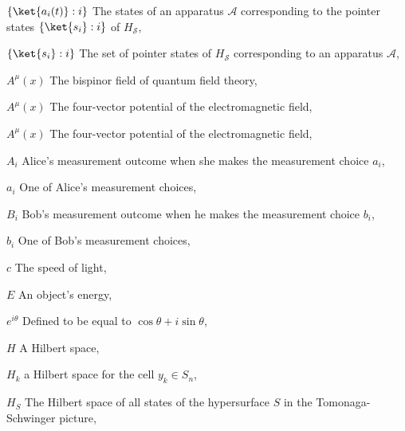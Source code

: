 \begin{thenomenclature}
      \item [{$\{\ket{a_i(t)}:i\}$}]\begingroup The states of an apparatus $\mathcal{A}$  corresponding to the pointer states $\{\ket{s_i}:i\}$ of $H_\mathcal{S}$, \nomrefpage{}
      \item [{$\{\ket{s_i}:i\}$}]\begingroup The set of pointer states of $H_\mathcal{S}$  corresponding to an apparatus $\mathcal{A}$, \nomrefpage{}
      \item [{$A^\mu (x)$}]\begingroup The bispinor field of quantum field theory, \nomrefpage {}
      \item [{$A^\mu (x)$}]\begingroup The four-vector potential of the electromagnetic field, \nomrefpage {}
      \item [{$A^\mu (x)$}]\begingroup The four-vector potential of the electromagnetic field, \nomrefpage {}
      \item [{$A_i$}]\begingroup Alice's measurement outcome when she makes the measurement choice $a_i$, \nomrefpage{}
      \item [{$a_i$}]\begingroup One of Alice's measurement choices, \nomrefpage{}
      \item [{$B_i$}]\begingroup Bob's measurement outcome when he makes the measurement choice $b_i$, \nomrefpage{}
      \item [{$b_i$}]\begingroup One of Bob's measurement choices, \nomrefpage{}
      \item [{$c$}]\begingroup The speed of light, \nomrefpage {}
      \item [{$E$}]\begingroup An object's energy, \nomrefpage{}
      \item [{$e^{i \theta }$}]\begingroup Defined to be equal to $\cos \theta + i\sin \theta $, \nomrefpage {}
      \item [{$H$}]\begingroup A Hilbert space, \nomrefpage{}
      \item [{$H_k$}]\begingroup a Hilbert space for the cell $y_k\in S_n$, \nomrefpage{}
      \item [{$H_S$}]\begingroup The Hilbert space of all states of the hypersurface $S$ in the Tomonaga-Schwinger picture, \nomrefpage{}

\end{thenomenclature}
